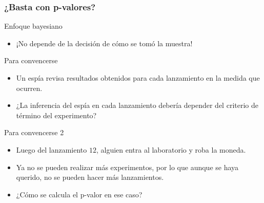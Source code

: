 \documentclass[table]{beamer}
\begin{document}
\begin{frame}
    \frametitle{¿Basta con p-valores?}
    \begin{alertblock}{Enfoque bayesiano}
        \begin{itemize}
            \item ¡No depende de la decisión de cómo se tomó la muestra!
        \end{itemize}
    \end{alertblock}
    \begin{block}{Para convencerse}
        \begin{itemize}
            \item Un espía revisa resultados obtenidos para cada lanzamiento en la medida que ocurren.
            \item ¿La inferencia del espía en cada lanzamiento debería depender del criterio de término del experimento?
        \end{itemize}
    \end{block}
    \begin{block}{Para convencerse 2}
        \begin{itemize}
            \item Luego del lanzamiento $12$, alguien entra al laboratorio y roba la moneda.
            \item Ya no se pueden realizar más experimentos, por lo que aunque se haya querido, no se pueden hacer más lanzamientos.
            \item ¿Cómo se calcula el p-valor en ese caso?
        \end{itemize}
    \end{block}
\end{frame}

\end{document}
